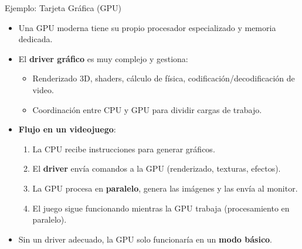 \documentclass{beamer}
\begin{document}
\begin{frame}{Ejemplo: Tarjeta Gráfica (GPU)}
    \begin{itemize}
        \item Una GPU moderna tiene su propio procesador especializado y memoria dedicada.
        \item El \textbf{driver gráfico} es muy complejo y gestiona:
            \begin{itemize}
                \item Renderizado 3D, shaders, cálculo de física, codificación/decodificación de video.
                \item Coordinación entre CPU y GPU para dividir cargas de trabajo.
            \end{itemize}
        \item \textbf{Flujo en un videojuego}:
            \begin{enumerate}
                \item La CPU recibe instrucciones para generar gráficos.
                \item El \textbf{driver} envía comandos a la GPU (renderizado, texturas, efectos).
                \item La GPU procesa en \textbf{paralelo}, genera las imágenes y las envía al monitor.
                \item El juego sigue funcionando mientras la GPU trabaja (procesamiento en paralelo).
            \end{enumerate}
        \item Sin un driver adecuado, la GPU solo funcionaría en un \textbf{modo básico}.
    \end{itemize}
\end{frame}
\end{document}
